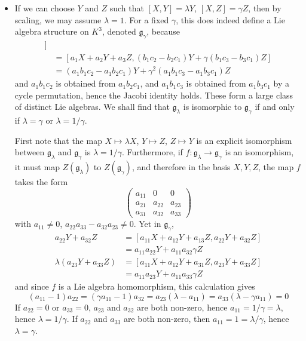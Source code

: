 \begin{itemize}
    \item If we can choose $Y$ and $Z$ such that $[X,Y] = \lambda Y$, $[X,Z] = \gamma Z$, then by scaling, we may assume $\lambda = 1$. For a fixed $\gamma$, this does indeed define a Lie algebra structure on $K^3$, denoted $\mathfrak{g}_\gamma$, because
    \begin{align*}
        [a_1X + a_2Y& + a_3Z, [b_1X + b_2Y + b_3Z, c_1X + c_2Y + c_3Z]]\\
        &= [a_1X + a_2Y + a_3Z, (b_1c_2 - b_2c_1) Y + \gamma (b_1 c_3 - b_3c_1) Z]\\
        &= (a_1b_1c_2 - a_1 b_2c_1) Y + \gamma^2 (a_1 b_1c_3 - a_1 b_3 c_1) Z
    \end{align*}
    and $a_1b_1c_2$ is obtained from $a_1b_2c_1$, and $a_1b_1c_3$ is obtained from $a_1b_3c_1$ by a cycle permutation, hence the Jacobi identity holds. These form a large class of distinct Lie algebras. We shall find that $\mathfrak{g}_\lambda$ is isomorphic to $\mathfrak{g}_\gamma$ if and only if $\lambda = \gamma$ or $\lambda = 1/\gamma$.

    First note that the map $X \mapsto \lambda X$, $Y \mapsto Z$, $Z \mapsto Y$ is an explicit isomorphism between $\mathfrak{g}_\lambda$ and $\mathfrak{g}_\gamma$ is $\lambda = 1/\gamma$. Furthermore, if $f: \mathfrak{g}_\lambda \to \mathfrak{g}_\gamma$ is an isomorphism, it must map $Z(\mathfrak{g}_\lambda)$ to $Z(\mathfrak{g}_\gamma)$, and therefore in the basis $X,Y,Z$, the map $f$ takes the form
    \[ \begin{pmatrix} a_{11} & 0 & 0 \\ a_{21} & a_{22} & a_{23} \\ a_{31} & a_{32} & a_{33} \end{pmatrix} \]
    with $a_{11} \neq 0$, $a_{22} a_{33} - a_{32} a_{23} \neq 0$. Yet in $\mathfrak{g}_\gamma$,
    \begin{align*}
        a_{22}Y + a_{32}Z &= [a_{11}X + a_{12}Y + a_{13}Z, a_{22}Y + a_{32}Z]\\
        &= a_{11}a_{22}Y + a_{11}a_{32} \gamma Z\\
        \lambda (a_{23}Y + a_{33}Z) &= [a_{11}X + a_{12}Y + a_{31}Z, a_{23}Y + a_{33}Z]\\
        &= a_{11}a_{23}Y + a_{11}a_{33} \gamma Z
    \end{align*}
    and since $f$ is a Lie algebra homomorphism, this calculation gives
    \[ (a_{11} - 1)a_{22} = (\gamma a_{11} - 1) a_{32} = a_{23}(\lambda - a_{11}) = a_{33}(\lambda - \gamma a_{11}) = 0 \]
    If $a_{22} = 0$ or $a_{33} = 0$, $a_{23}$ and $a_{32}$ are both non-zero, hence $a_{11} = 1/\gamma = \lambda$, hence $\lambda = 1/\gamma$. If $a_{22}$ and $a_{33}$ are both non-zero, then $a_{11} = 1 = \lambda/\gamma$, hence $\lambda = \gamma$.


\end{itemize}
